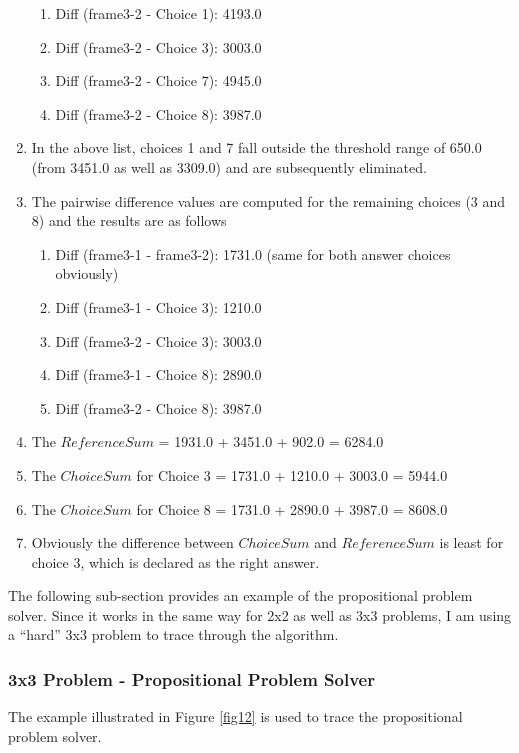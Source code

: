 \documentclass[10pt, letter]{article}
\begin{document}
\begin{enumerate}
\begin{enumerate}
		\item Diff (frame3-2 - Choice 1): 4193.0
		\item Diff (frame3-2 - Choice 3): 3003.0
		\item Diff (frame3-2 - Choice 7): 4945.0
		\item Diff (frame3-2 - Choice 8): 3987.0		
	\end{enumerate}
\item In the above list, choices 1 and 7 fall outside the threshold range of 650.0 (from 3451.0 as well as 3309.0) and are subsequently eliminated.
\item The pairwise difference values are computed for the remaining choices (3 and 8) and the results are as follows
	\begin{enumerate}
		\item Diff (frame3-1 - frame3-2): 1731.0 (same for both answer choices obviously)
		\item Diff (frame3-1 - Choice 3): 1210.0
		\item Diff (frame3-2 - Choice 3): 3003.0
		\item Diff (frame3-1 - Choice 8): 2890.0
		\item Diff (frame3-2 - Choice 8): 3987.0 
	\end{enumerate}
\item The $ReferenceSum$ = 1931.0 + 3451.0 + 902.0 = 6284.0
\item The $ChoiceSum$ for Choice 3 = 1731.0 + 1210.0 + 3003.0 = 5944.0
\item The $ChoiceSum$ for Choice 8 = 1731.0 + 2890.0 + 3987.0 = 8608.0
\item Obviously the difference between $ChoiceSum$ and $ReferenceSum$ is least for choice 3, which is declared as the right answer.
\end{enumerate}

The following sub-section provides an example of the propositional problem solver. Since it works in the same way for 2x2 as well as 3x3 problems, I am using a ``hard'' 3x3 problem to trace through the algorithm.

\subsubsection*{3x3 Problem - Propositional Problem Solver}
The example illustrated in Figure \ref{fig12} is used to trace the propositional problem solver.
\end{document}
